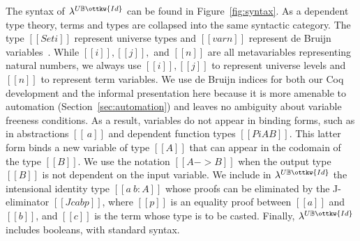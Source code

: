 \documentclass[acmsmall,screen=true,
\ifpublic review=false\else,review=true\fi
  ,anonymous=\ifanonymous true\else false\fi]{acmart}
\newcommand{\lang}{$\lambda^{U\mathbb{B}\ottkw{Id}}$\xspace}
\newcommand{\scw}[1]{}
\begin{document}
The syntax of \lang can be found in Figure~\ref{fig:syntax}.  As a dependent
type theory, terms and types are collapsed into the same syntactic
category. The type $[[Set i]]$ represent universe types and $[[var n]]$
represent de Bruijn variables~\cite{debruijn}.  While $[[i]],[[j]],$ and
$[[n]]$ are all metavariables representing natural numbers, we always use
$[[i]],[[j]]$ to represent universe levels and $[[n]]$ to represent term
variables.  We use de Bruijn indices for both our Coq development and the
informal presentation here because it is more amenable to automation
(Section~\ref{sec:automation}) and leaves no ambiguity about variable freeness
conditions. As a result, variables do not appear in binding forms, such as in
abstractions $[[ \ a ]]$ and dependent function types $[[Pi A B]]$.  This latter
form binds a new variable of type $[[A]]$ that can appear in the codomain of
the type $[[B]]$.  We use the notation $[[A -> B]]$ when the output type
$[[B]]$ is not dependent on the input variable.
We include in \lang{} the intensional identity type
$[[a ~ b : A]]$ whose proofs can be eliminated by the J-eliminator
$[[J c a b p]]$, where $[[p]]$ is an equality proof between $[[a]]$ and
$[[b]]$, and $[[c]]$ is the term whose type is to be casted.
Finally, \lang{} includes booleans, with standard syntax.
\scw{Example of
 what you can use identity types for? Or an example of a program that uses
J?}

\end{document}
